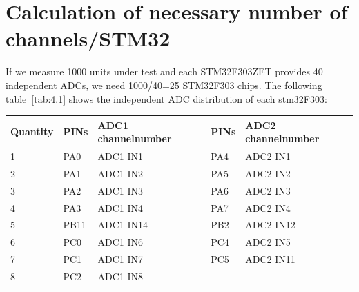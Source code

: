 \section{Calculation of necessary number of channels/STM32}
\label{sec:Calculation of necessary number of channels/STM32}
If we measure 1000 units under test and each STM32F303ZET provides 40
independent ADCs, we need 1000/40=25 STM32F303 chips. The following
table~\ref{tab:4.1} shows the independent ADC distribution of each stm32F303:

\begin{table}[]
\begin{tabular}{@{}lllll@{}}
\toprule
\rowcolor[HTML]{EFEFEF} 
Quantity & PINs & ADC1 channelnumber & PINs & ADC2 channelnumber \\ \midrule
\multicolumn{1}{|l|}{\cellcolor[HTML]{EFEFEF}1} & \multicolumn{1}{l|}{PA0} & \multicolumn{1}{l|}{ADC1 IN1} & \multicolumn{1}{l|}{PA4} & \multicolumn{1}{l|}{ADC2 IN1} \\ \midrule
\multicolumn{1}{|l|}{\cellcolor[HTML]{EFEFEF}2} & \multicolumn{1}{l|}{PA1} & \multicolumn{1}{l|}{ADC1 IN2} & \multicolumn{1}{l|}{PA5} & \multicolumn{1}{l|}{ADC2 IN2} \\ \midrule
\multicolumn{1}{|l|}{\cellcolor[HTML]{EFEFEF}3} & \multicolumn{1}{l|}{PA2} & \multicolumn{1}{l|}{ADC1 IN3} & \multicolumn{1}{l|}{PA6} & \multicolumn{1}{l|}{ADC2 IN3} \\ \midrule
\multicolumn{1}{|l|}{\cellcolor[HTML]{EFEFEF}4} & \multicolumn{1}{l|}{PA3} & \multicolumn{1}{l|}{ADC1 IN4} & \multicolumn{1}{l|}{PA7} & \multicolumn{1}{l|}{ADC2 IN4} \\ \midrule
\multicolumn{1}{|l|}{\cellcolor[HTML]{EFEFEF}5} & \multicolumn{1}{l|}{PB11} & \multicolumn{1}{l|}{ADC1 IN14} & \multicolumn{1}{l|}{PB2} & \multicolumn{1}{l|}{ADC2 IN12} \\ \midrule
\multicolumn{1}{|l|}{\cellcolor[HTML]{EFEFEF}6} & \multicolumn{1}{l|}{PC0} & \multicolumn{1}{l|}{ADC1 IN6} & \multicolumn{1}{l|}{PC4} & \multicolumn{1}{l|}{ADC2 IN5} \\ \midrule
\multicolumn{1}{|l|}{\cellcolor[HTML]{EFEFEF}7} & \multicolumn{1}{l|}{PC1} & \multicolumn{1}{l|}{ADC1 IN7} & \multicolumn{1}{l|}{PC5} & \multicolumn{1}{l|}{ADC2 IN11} \\ \midrule
\multicolumn{1}{|l|}{\cellcolor[HTML]{EFEFEF}8} & \multicolumn{1}{l|}{PC2} & \multicolumn{1}{l|}{ADC1 IN8} & \multicolumn{1}{l|}{} & \multicolumn{1}{l|}{} \\ \midrule

\end{tabular}
\end{table}
